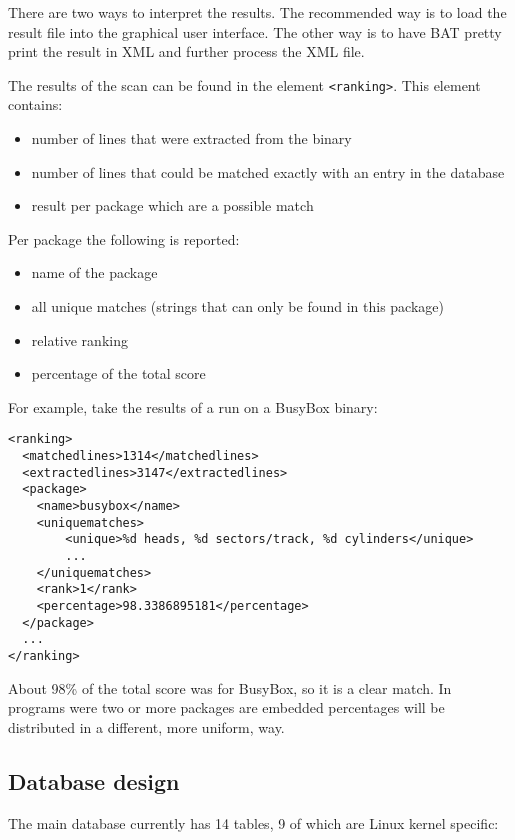 \documentclass[10pt]{article}
\begin{document}
There are two ways to interpret the results. The recommended way is to load the
result file into the graphical user interface. The other way is to have BAT
pretty print the result in XML and further process the XML file.

The results of the scan can be found in the element \texttt{<ranking>}. This
element contains:

\begin{itemize}
\item number of lines that were extracted from the binary
\item number of lines that could be matched exactly with an entry in the
database
\item result per package which are a possible match
\end{itemize}

Per package the following is reported:

\begin{itemize}
\item name of the package
\item all unique matches (strings that can only be found in this package)
\item relative ranking
\item percentage of the total score
\end{itemize}

For example, take the results of a run on a BusyBox binary:

\begin{verbatim}
<ranking>
  <matchedlines>1314</matchedlines>
  <extractedlines>3147</extractedlines>
  <package>
    <name>busybox</name>
    <uniquematches>
        <unique>%d heads, %d sectors/track, %d cylinders</unique>
        ...
    </uniquematches>
    <rank>1</rank>
    <percentage>98.3386895181</percentage>
  </package>
  ...
</ranking>
\end{verbatim}

About 98\% of the total score was for BusyBox, so it is a clear match. In
programs were two or more packages are embedded percentages will be distributed
in a different, more uniform, way.

\subsection{Database design}

The main database currently has 14 tables, 9 of which are Linux kernel specific:
\end{document}
